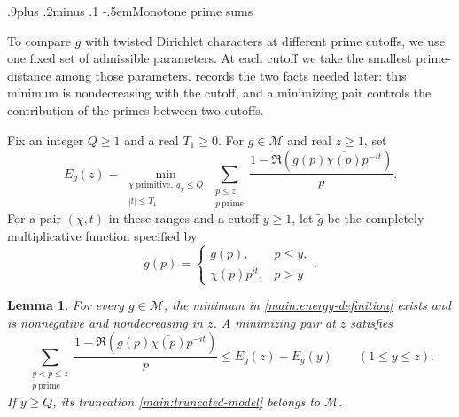 \documentclass[twoside]{aomart}
\makeatletter
\theoremstyle{paperplain}
\newtheorem{lemma}[theorem]{Lemma}
\theoremstyle{paperdefinition}
\renewcommand\subsection{\@startsection{subsection}{2}{\z@}
  {.9\baselineskip plus .2\baselineskip minus .1\baselineskip}
  {-.5em}{\normalfont\bfseries}}
\numberwithin{equation}{section}
\makeatother
\begin{document}
\subsection{Monotone prime sums}

To compare $g$ with twisted Dirichlet characters at different prime
cutoffs, we use one fixed set of admissible parameters.  At each cutoff
we take the smallest prime-distance among those parameters.
 records the two facts needed later: this
minimum is nondecreasing with the cutoff, and a minimizing pair controls
the contribution of the primes between two cutoffs.

Fix an integer $Q\ge1$ and a real $T_1\ge0$.
For $g\in\mathcal M$ and real $z\ge1$, set
\begin{equation}
 E_g(z)=\min_{\substack{\chi\ \mathrm{primitive},\ q_\chi\le Q\\
                             |t|\le T_1}}
       \sum_{\substack{p\le z\\p\ \mathrm{prime}}}
       \frac{1-\Re(g(p)\overline{\chi(p)}p^{-it})}{p}.
 \label{main:energy-definition}
\end{equation}
For a pair $(\chi,t)$ in these ranges and a cutoff $y\ge1$, let
$\widetilde g$ be the completely multiplicative function specified by
\begin{equation}
 \widetilde g(p)=
 \begin{cases}
 g(p),&p\le y,\\
 \chi(p)p^{it},&p>y
 \end{cases}.
 \label{main:truncated-model}
\end{equation}

\begin{lemma}\label{main:minimized-energy}
For every $g\in\mathcal M$, the minimum in
\eqref{main:energy-definition} exists and is nonnegative and
nondecreasing in $z$. A minimizing pair at $z$ satisfies
\begin{equation}
 \sum_{\substack{y<p\le z\\p\ \mathrm{prime}}}
       \frac{1-\Re(g(p)\overline{\chi(p)}p^{-it})}{p}
 \le E_g(z)-E_g(y)\qquad(1\le y\le z).
 \label{main:tail-minimum}
\end{equation}
If $y\ge Q$, its truncation \eqref{main:truncated-model} belongs to
$\mathcal M$.
\end{lemma}
\end{document}
